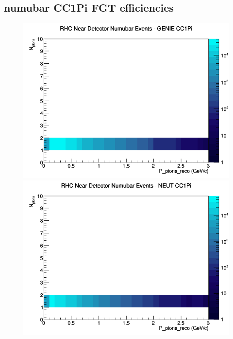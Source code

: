 \documentclass[12pt]{article}
\begin{document}
\subsection{numubar CC1Pi FGT efficiencies}
\begin{figure}[h]
\includegraphics[width=\linewidth]{eff_N_P/FGT/pions/CC1Pi_RHC_ND_numubar_N_P_GENIE.png}
\endminipage
{}
\includegraphics[width=\linewidth]{eff_N_P/FGT/pions/CC1Pi_RHC_ND_numubar_N_P_NEUT.png}
\endminipage
{}

\end{figure}
\end{document}
